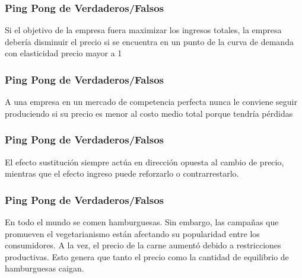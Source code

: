 \documentclass{beamer}
\begin{document}
\begin{frame}
\frametitle{Ping Pong de Verdaderos/Falsos}
\centering
Si el objetivo de la empresa fuera maximizar los ingresos totales, la empresa debería disminuir el precio si se encuentra en un punto de la curva de demanda con elasticidad precio mayor a 1
\end{frame}

\begin{frame}
\frametitle{Ping Pong de Verdaderos/Falsos}
\centering
A una empresa en un mercado de competencia perfecta nunca le conviene seguir produciendo si su precio es menor al costo medio total porque tendría pérdidas
\end{frame}

\begin{frame}
\frametitle{Ping Pong de Verdaderos/Falsos}
\centering
El efecto sustitución siempre actúa en dirección opuesta al cambio de precio, mientras que el efecto ingreso puede reforzarlo o contrarrestarlo.
\end{frame}


\begin{frame}
\frametitle{Ping Pong de Verdaderos/Falsos}
\centering
En todo el mundo se comen hamburguesas. Sin embargo, las campañas que promueven el vegetarianismo están afectando su popularidad entre los consumidores. A la vez, el precio de la carne aumentó debido a restricciones productivas. Esto genera que tanto el precio como la cantidad de equilibrio de hamburguesas caigan. 
\end{frame}
\end{document}
